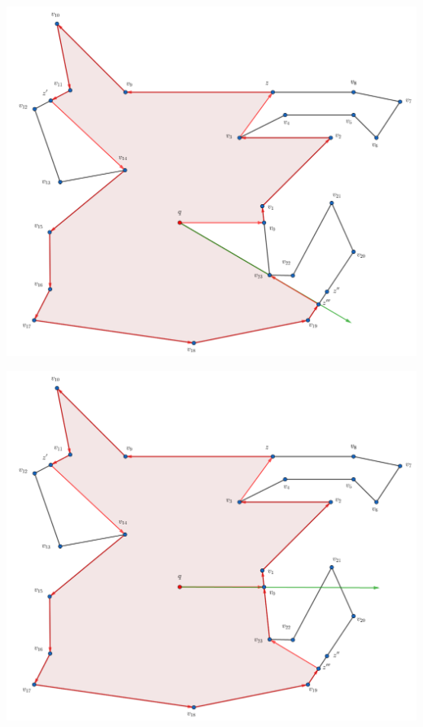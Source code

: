\begin{frame}
  \centering \includegraphics[width=0.70 \paperwidth]{images/Ejecucion/e40.png}
\end{frame}

\begin{frame}
  \centering \includegraphics[width=0.70 \paperwidth]{images/Ejecucion/e41.png}
\end{frame}

